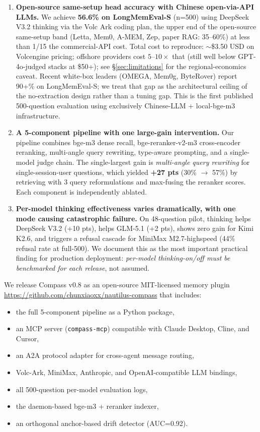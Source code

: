 \begin{enumerate}
\item \textbf{Open-source same-setup head accuracy with Chinese
   open-via-API LLMs.} We achieve \textbf{56.6\% on LongMemEval-S}
   (n=500) using DeepSeek V3.2 thinking via the Volc Ark coding plan,
   the upper end of the open-source same-setup band (Letta, Mem0,
   A-MEM, Zep, paper RAG: 35--60\%) at less than 1/15 the
   commercial-API cost. Total cost to reproduce: \(\sim\)\$3.50 USD on
   Volcengine pricing; offshore providers cost $5$--$10\times$ that
   (still well below GPT-4o-judged stacks at \$50+); see
   \S\ref{sec:limitations} for the regional-economics caveat. Recent
   white-box leaders (OMEGA, Mem0g, ByteRover) report 90+\% on
   LongMemEval-S; we treat that gap as the architectural ceiling of
   the no-extraction design rather than a tuning gap. This is the
   first published 500-question evaluation using exclusively
   Chinese-LLM + local-bge-m3 infrastructure.

\item \textbf{A 5-component pipeline with one large-gain intervention.}
   Our pipeline combines bge-m3 dense recall, bge-reranker-v2-m3
   cross-encoder reranking, multi-angle query rewriting,
   type-aware prompting, and a single-model judge chain. The
   single-largest gain is \emph{multi-angle query rewriting} for
   single-session-user questions, which yielded \textbf{+27 pts} (30\%
   \(\to\) 57\%) by retrieving with 3 query reformulations and
   max-fusing the reranker scores. Each component is independently
   ablated.

\item \textbf{Per-model thinking effectiveness varies dramatically, with
   one mode causing catastrophic failure.} On 48-question pilot,
   thinking helps DeepSeek V3.2 (+10 pts), helps GLM-5.1 (+2 pts),
   shows zero gain for Kimi K2.6, and triggers a refusal cascade for
   MiniMax M2.7-highspeed (44\% refusal rate at full-500). We document
   this as the most important practical finding for production
   deployment: \emph{per-model thinking-on/off must be benchmarked
   for each release}, not assumed.
\end{enumerate}

We release Compass v0.8 as an open-source MIT-licensed memory plugin
\url{https://github.com/chunxiaoxx/nautilus-compass} that includes:

\begin{itemize}
\item the full 5-component pipeline as a Python package,
\item an MCP server (\texttt{compass-mcp}) compatible with Claude
  Desktop, Cline, and Cursor,
\item an A2A protocol adapter for cross-agent message routing,
\item Volc-Ark, MiniMax, Anthropic, and OpenAI-compatible LLM bindings,
\item all 500-question per-model evaluation logs,
\item the daemon-based bge-m3 + reranker indexer,
\item an orthogonal anchor-based drift detector (AUC=0.92).
\end{itemize}

